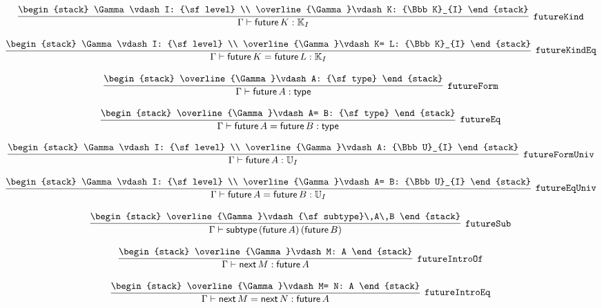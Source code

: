\[
\infer[{\tt futureKind}]{\Gamma \vdash {\sf future}\,K: {\Bbb K}_{I}}{
\begin{stack}
\Gamma \vdash I: {\sf level}
\\
\overline{\Gamma}\vdash K: {\Bbb K}_{I}
\end{stack}}
\]

\[
\infer[{\tt futureKindEq}]{\Gamma \vdash {\sf future}\,K= {\sf future}\,L: {\Bbb K}_{I}}{
\begin{stack}
\Gamma \vdash I: {\sf level}
\\
\overline{\Gamma}\vdash K= L: {\Bbb K}_{I}
\end{stack}}
\]

\[
\infer[{\tt futureForm}]{\Gamma \vdash {\sf future}\,A: {\sf type}}{
\begin{stack}
\overline{\Gamma}\vdash A: {\sf type}
\end{stack}}
\]

\[
\infer[{\tt futureEq}]{\Gamma \vdash {\sf future}\,A= {\sf future}\,B: {\sf type}}{
\begin{stack}
\overline{\Gamma}\vdash A= B: {\sf type}
\end{stack}}
\]

\[
\infer[{\tt futureFormUniv}]{\Gamma \vdash {\sf future}\,A: {\Bbb U}_{I}}{
\begin{stack}
\Gamma \vdash I: {\sf level}
\\
\overline{\Gamma}\vdash A: {\Bbb U}_{I}
\end{stack}}
\]

\[
\infer[{\tt futureEqUniv}]{\Gamma \vdash {\sf future}\,A= {\sf future}\,B: {\Bbb U}_{I}}{
\begin{stack}
\Gamma \vdash I: {\sf level}
\\
\overline{\Gamma}\vdash A= B: {\Bbb U}_{I}
\end{stack}}
\]

\[
\infer[{\tt futureSub}]{\Gamma \vdash {\sf subtype}\,({\sf future}\,A)\,({\sf future}\,B)}{
\begin{stack}
\overline{\Gamma}\vdash {\sf subtype}\,A\,B
\end{stack}}
\]

\[
\infer[{\tt futureIntroOf}]{\Gamma \vdash {\sf next}\,M: {\sf future}\,A}{
\begin{stack}
\overline{\Gamma}\vdash M: A
\end{stack}}
\]

\[
\infer[{\tt futureIntroEq}]{\Gamma \vdash {\sf next}\,M= {\sf next}\,N: {\sf future}\,A}{
\begin{stack}
\overline{\Gamma}\vdash M= N: A
\end{stack}}
\]

